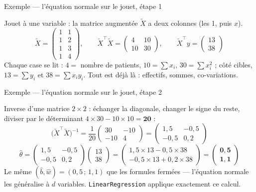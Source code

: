 \documentclass[aspectratio=169,11pt]{beamer}
\begin{document}
\begin{frame}{Exemple — l'équation normale sur le jouet, étape 1}
\begin{ucadex}
{\small Jouet à une variable : la matrice augmentée $\tilde X$ a deux colonnes (les 1, puis $x$).
\[ \tilde X = \begin{pmatrix} 1 & 1\\ 1 & 2\\ 1 & 3\\ 1 & 4 \end{pmatrix}, \qquad
\tilde X^{\top}\tilde X = \begin{pmatrix} 4 & 10\\ 10 & 30 \end{pmatrix}, \qquad
\tilde X^{\top} y = \begin{pmatrix} 13\\ 38 \end{pmatrix} \]
Chaque case se lit : $4 = $ nombre de patients, $10 = \sum x_i$, $30 = \sum x_i^2$ ; côté cibles, $13 = \sum y_i$ et $38 = \sum x_i y_i$. Tout est déjà là : effectifs, sommes, co-variations.}
\end{ucadex}
\end{frame}

\begin{frame}{Exemple — l'équation normale sur le jouet, étape 2}
\begin{ucadex}
{\small Inverse d'une matrice $2\times 2$ : échanger la diagonale, changer le signe du reste, diviser par le déterminant $4\times 30 - 10\times 10 = \mathbf{20}$ :
\[ \big(\tilde X^{\top}\tilde X\big)^{-1} = \frac{1}{20}\begin{pmatrix} 30 & -10\\ -10 & 4 \end{pmatrix} = \begin{pmatrix} 1{,}5 & -0{,}5\\ -0{,}5 & 0{,}2 \end{pmatrix} \]
\[ \hat\theta = \begin{pmatrix} 1{,}5 & -0{,}5\\ -0{,}5 & 0{,}2 \end{pmatrix}\begin{pmatrix} 13\\ 38 \end{pmatrix} = \begin{pmatrix} 1{,}5\times 13 - 0{,}5\times 38\\ -0{,}5\times 13 + 0{,}2\times 38 \end{pmatrix} = \begin{pmatrix} \mathbf{0{,}5}\\ \mathbf{1{,}1} \end{pmatrix} \]
Le même $(\hat b, \hat w) = (0{,}5\,;\,1{,}1)$ que les formules fermées — l'équation normale les généralise à $d$ variables. \texttt{LinearRegression} applique exactement ce calcul.}
\end{ucadex}
\end{frame}
\end{document}
